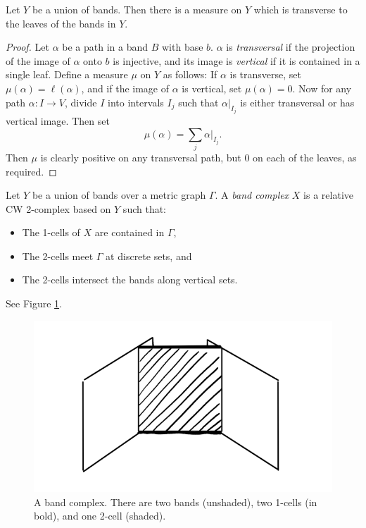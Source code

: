 \begin{lemma}\label{Ymeasure}
    Let $Y$ be a union of bands. Then there is a measure on $Y$ which is transverse to the leaves of the bands in $Y$.
\end{lemma}
\begin{proof}
     Let $\alpha$ be a path in a band $B$ with base $b$. $\alpha$ is \textit{transversal} if the projection of the image of $\alpha$ onto $b$ is injective, and its image is \textit{vertical} if it is contained in a single leaf. Define a measure $\mu$ on $Y$ as follows: If $\alpha$ is transverse, set $\mu(\alpha)=\ell(\alpha)$, and if the image of $\alpha$ is vertical, set $\mu(\alpha)=0$. Now for any path $\alpha:I\rightarrow V$, divide $I$ into intervals $I_j$ such that $\alpha\vert_{I_j}$ is either transversal or has vertical image. Then set \[\mu(\alpha)=\underset{j}\sum\alpha\vert_{I_j}.\] Then $\mu$ is clearly positive on any transversal path, but 0 on each of the leaves, as required.
\end{proof}


\begin{definition}
    Let $Y$ be a union of bands over a metric graph $\Gamma$. A \emph{band complex} $X$ is a relative CW 2-complex based on $Y$ such that:
    \begin{itemize}
        \item The 1-cells of $X$ are contained in $\Gamma$,
        \item The 2-cells meet $\Gamma$ at discrete sets, and
        \item The 2-cells intersect the bands along vertical sets.
    \end{itemize}
    See Figure \ref{bandcplx}.
\end{definition}

\begin{figure}[h]
    \centering
    \includegraphics[width=0.6\linewidth]{sections/lorna/Band Complex.png}
    \caption{A band complex. There are two bands (unshaded), two 1-cells (in bold), and one 2-cell (shaded).}
    \label{bandcplx}
\end{figure}

